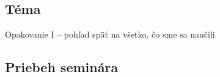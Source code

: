 
\subsection*{Téma}
Opakovanie I -- pohľad späť na všetko, čo sme sa naučili

\subsection{Priebeh seminára}

